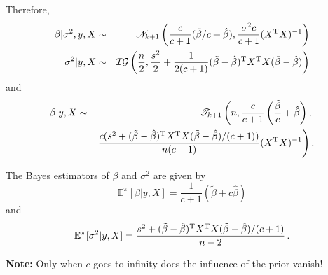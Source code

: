 \begin{slide}
\end{slide}\begin{slide}
Therefore,
\begin{eqnarray*}
\beta|\sigma^2,y,X&\sim&\mathscr{N}_{k+1}\left(\frac{c}{c+1}(\tilde\beta/c+\hat\beta),
\frac{\sigma^2c}{c+1}(X^{\mathrm{T}} X)^{-1}\right)\\
\sigma^2|y,X&\sim&\mathcal{IG}\left(\frac{n}{2},\frac{s^2}{2}+\frac{1}{2(c+1)}
(\tilde\beta-\hat\beta)^{\mathrm{T}} X^{\mathrm{T}} X(\tilde\beta-\hat\beta)\right)
\end{eqnarray*}
and
\small
\begin{eqnarray*}
\beta|y,X &\sim& \mathscr{T}_{k+1}\left(n,\frac{c}{c+1}\left(\frac{\tilde\beta}{c}+\hat\beta\right),\right. \\
&& \left.\frac{c(s^2+(\tilde\beta-\hat\beta)^{\mathrm{T}} X^{\mathrm{T}} 
X(\tilde\beta-\hat\beta)/(c+1))}{n(c+1)}(X^{\mathrm{T}} X)^{-1}\right).
\end{eqnarray*}
\normalsize

\end{slide}\begin{slide}

The Bayes estimators of $\beta$ and $\sigma^2$ are given by
$$
\mathbb{E}^\pi[\beta|y,X]=\frac{1}{c+1}(\tilde\beta+c\hat\beta)
$$
and
$$
\mathbb{E}^\pi[\sigma^2|y,X]=\frac{s^2+(\tilde\beta-\hat\beta)^{\mathrm{T}} X^{\mathrm{T}} X(\tilde\beta-\hat\beta)/(c+1)}{n-2}\,.
$$ 

\medskip\pause
{\bf Note:}
Only when $c$ goes to infinity does the influence of the prior vanish!

\end{slide}\begin{slide}

\end{slide}
